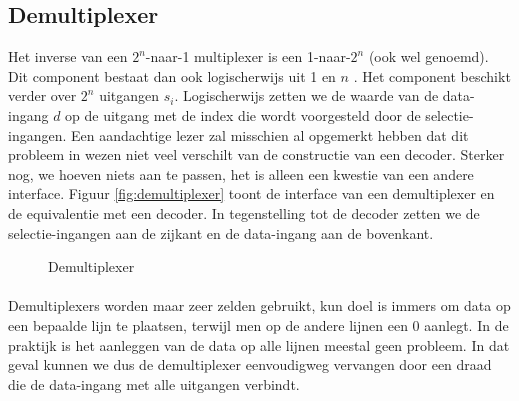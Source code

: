 \subsection{Demultiplexer}
\label{ss:demultiplexer}
Het inverse van een $2^n$-naar-1 multiplexer is een 1-naar-$2^n$  (ook wel  genoemd). Dit component bestaat dan ook logischerwijs uit 1  en $n$ . Het component beschikt verder over $2^n$ uitgangen $s_i$. Logischerwijs zetten we de waarde van de data-ingang $d$ op de uitgang met de index die wordt voorgesteld door de selectie-ingangen. Een aandachtige lezer zal misschien al opgemerkt hebben dat dit probleem in wezen niet veel verschilt van de constructie van een decoder. Sterker nog, we hoeven niets aan te passen, het is alleen een kwestie van een andere interface. Figuur \ref{fig:demultiplexer} toont de interface van een demultiplexer en de equivalentie met een decoder. In tegenstelling tot de decoder zetten we de selectie-ingangen aan de zijkant en de data-ingang aan de bovenkant.
\begin{figure}[hbt]
\centering
{}
\caption{Demultiplexer}
\end{figure}
\paragraph{}
Demultiplexers worden maar zeer zelden gebruikt, kun doel is immers om data op een bepaalde lijn te plaatsen, terwijl men op de andere lijnen een 0 aanlegt. In de praktijk is het aanleggen van de data op alle lijnen meestal geen probleem. In dat geval kunnen we dus de demultiplexer eenvoudigweg vervangen door een draad die de data-ingang met alle uitgangen verbindt.
